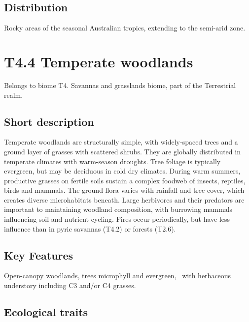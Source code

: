\documentclass[
  letterpaper,
  DIV=11,
  numbers=noendperiod]{scrartcl}
\begin{document}
\subsection{Distribution}\label{distribution-85}

Rocky areas of the seasonal Australian tropics, extending to the
semi-arid zone.

\section{T4.4 Temperate woodlands}\label{t4.4-temperate-woodlands}

Belongs to biome T4. Savannas and grasslands biome, part of the
Terrestrial realm.

\subsection{Short description}\label{short-description-86}

Temperate woodlands are structurally simple, with widely-spaced trees
and a ground layer of grasses with scattered shrubs. They are globally
distributed in temperate climates with warm-season droughts. Tree
foliage is typically evergreen, but may be deciduous in cold dry
climates. During warm summers, productive grasses on fertile soils
sustain a complex foodweb of insects, reptiles, birds and mammals. The
ground flora varies with rainfall and tree cover, which creates diverse
microhabitats beneath. Large herbivores and their predators are
important to maintaining woodland composition, with burrowing mammals
influencing soil and nutrient cycling. Fires occur periodically, but
have less influence than in pyric savannas (T4.2) or forests (T2.6).

\subsection{Key Features}\label{key-features-86}

Open-canopy woodlands, trees microphyll and evergreen,~ with herbaceous
understory including C3 and/or C4 grasses.

\subsection{Ecological traits}\label{ecological-traits-86}
\end{document}
